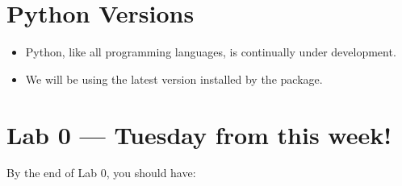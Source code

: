 \documentclass[letterpaper,10pt,english]{sphinxmanual}
\begin{document}
\section{Python Versions}
\label{\detokenize{lecture_notes/lec01_intro:python-versions}}\begin{itemize}
\item {} 
Python, like all programming languages, is continually under
development.

\item {} 
We will be using the latest version installed by the  package.

\end{itemize}


\section{Lab 0 — Tuesday from this week!}
\label{\detokenize{lecture_notes/lec01_intro:lab-0-tuesday-from-this-week}}
By the end of Lab 0, you should have:
\end{document}
